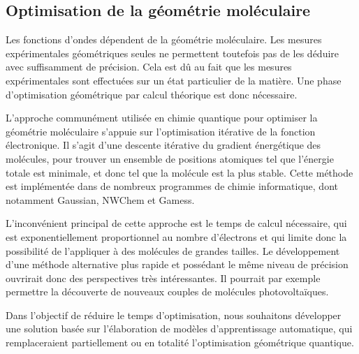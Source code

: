 \subsection{Optimisation de la géométrie moléculaire}


\par Les fonctions d'ondes dépendent de la géométrie moléculaire. Les mesures expérimentales géométriques seules ne permettent toutefois pas de les déduire avec suffisamment de précision. Cela est dû au fait que les mesures expérimentales sont effectuées sur un état particulier de la matière. Une phase d'optimisation géométrique par calcul théorique est donc nécessaire.

\par L'approche communément utilisée en chimie quantique pour optimiser la géométrie moléculaire s'appuie sur l'optimisation itérative de la fonction électronique. Il s'agit d'une descente itérative du gradient énergétique des molécules, pour trouver un ensemble de positions atomiques tel que l'énergie totale est minimale, et donc tel que la molécule est la plus stable. Cette méthode est implémentée dans de nombreux programmes de chimie informatique, dont notamment Gaussian, NWChem et Gamess.\\

\par L'inconvénient principal de cette approche est le temps de calcul nécessaire, qui est exponentiellement proportionnel au nombre d'électrons et qui limite donc la possibilité de l'appliquer à des molécules de grandes tailles. Le développement d'une méthode alternative plus rapide et possédant le même niveau de précision ouvrirait donc des perspectives très intéressantes. Il pourrait par exemple permettre la découverte de nouveaux couples de molécules photovoltaïques.
\par Dans l'objectif de réduire le temps d'optimisation, nous souhaitons développer une solution basée sur l'élaboration de modèles d'apprentissage automatique, qui remplaceraient partiellement ou en totalité l'optimisation géométrique quantique.
